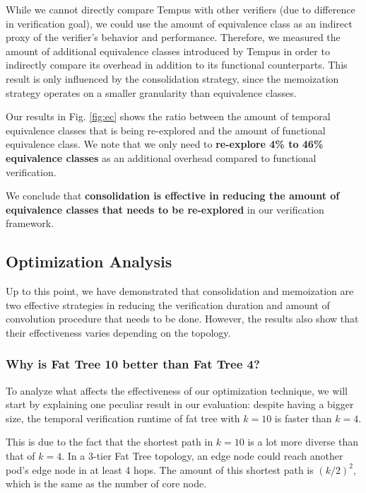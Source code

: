 While we cannot directly compare Tempus with other verifiers (due to difference in verification goal), 
we could use the amount of equivalence class as an indirect proxy of the verifier's behavior and performance.
Therefore, we measured the amount of additional equivalence classes introduced by Tempus in order to 
indirectly compare its overhead in addition to its functional counterparts.
This result is only influenced by the consolidation strategy, since the memoization strategy operates on 
a smaller granularity than equivalence classes.

Our results in Fig. \ref{fig:ec} shows the ratio between the amount of temporal equivalence classes that is 
being re-explored and the amount of functional equivalence class.
We note that we only need to \textbf{re-explore 4\% to 46\% equivalence classes} as an additional overhead 
compared to functional verification.

We conclude that \textbf{consolidation is effective in reducing the amount of equivalence classes that 
needs to be re-explored} in our verification framework.

\subsection{Optimization Analysis}



Up to this point, we have demonstrated that consolidation and memoization are two effective strategies in 
reducing the verification duration and amount of convolution procedure that needs to be done.
However, the results also show that their effectiveness varies depending on the topology.

\subsubsection{Why is Fat Tree 10 better than Fat Tree 4?}
To analyze what affects the effectiveness of our optimization technique, we will start by explaining 
one peculiar result in our evaluation: despite having a bigger size, the temporal verification runtime 
of fat tree with $k = 10$ is faster than $k = 4$.

This is due to the fact that the shortest path in $k = 10$ is a lot more diverse than that of $k = 4$.
In a 3-tier Fat Tree topology, an edge node could reach another pod's edge node in at least 4 hops.
The amount of this shortest path is $(k/2)^2$, which is the same as the number of core node.

